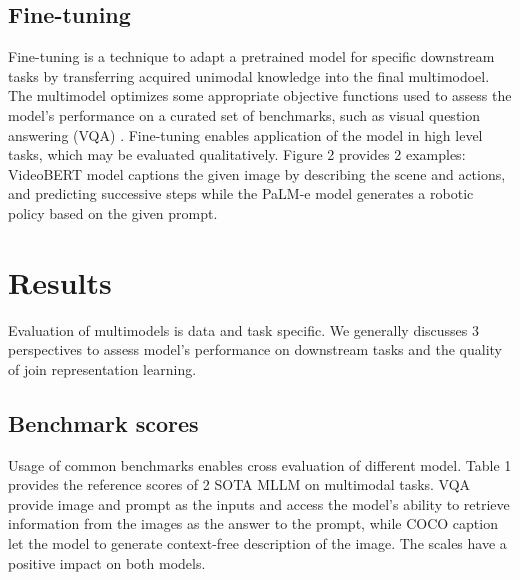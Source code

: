 \documentclass[11pt]{article}
\begin{document}
\subsection{Fine-tuning}

Fine-tuning is a technique to adapt a pretrained model for specific downstream tasks by transferring acquired unimodal knowledge into the final multimodoel. The multimodel optimizes some appropriate objective functions used to assess the model's performance on a curated set of benchmarks, such as visual question answering (VQA) \citep{DBLP:journals/corr/abs-2306-13549}. Fine-tuning enables application of the model in high level tasks, which may be evaluated qualitatively. Figure 2 provides 2 examples: VideoBERT model \citep{DBLP:conf/iccv/SunMV0S19} captions the given image by describing the scene and actions, and predicting successive steps while the PaLM-e model \citep{DBLP:conf/icml/DriessXSLCIWTVY23} generates a robotic policy based on the given prompt.

\section{Results}
Evaluation of multimodels is data and task specific. We generally discusses 3 perspectives to assess model's performance on downstream tasks and the quality of join representation learning.

\subsection{Benchmark scores}

Usage of common benchmarks enables cross evaluation of different model. Table 1 provides the reference scores of 2 SOTA MLLM on multimodal tasks. VQA \citep{DBLP:journals/ijcv/GoyalKASBP19} provide image and prompt as the inputs and access the model's ability to retrieve information from the images as the answer to the prompt, while COCO caption \citep{DBLP:journals/corr/ChenFLVGDZ15} let the model to generate context-free description of the image. The scales have a positive impact on both models. 
\end{document}
